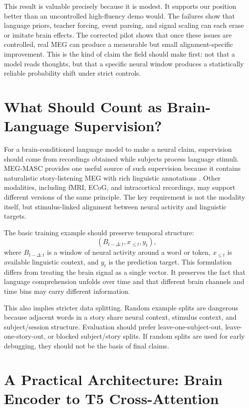\documentclass{article}
\begin{document}
This result is valuable precisely because it is modest.
It supports our position better than an uncontrolled high-fluency demo would.
The failures show that language priors, teacher forcing, event parsing, and signal scaling can each erase or imitate brain effects.
The corrected pilot shows that once these issues are controlled, real MEG can produce a measurable but small alignment-specific improvement.
This is the kind of claim the field should make first: not that a model reads thoughts, but that a specific neural window produces a statistically reliable probability shift under strict controls.

\section{What Should Count as Brain-Language Supervision?}

For a brain-conditioned language model to make a neural claim, supervision should come from recordings obtained while subjects process language stimuli.
MEG-MASC provides one useful source of such supervision because it contains naturalistic story-listening MEG with rich linguistic annotations \citep{gwilliams2023megmasc}.
Other modalities, including fMRI, ECoG, and intracortical recordings, may support different versions of the same principle.
The key requirement is not the modality itself, but stimulus-linked alignment between neural activity and linguistic targets.

The basic training example should preserve temporal structure:
\[
(B_{t-\Delta:t}, x_{\leq t}, y_t),
\]
where $B_{t-\Delta:t}$ is a window of neural activity around a word or token, $x_{\leq t}$ is available linguistic context, and $y_t$ is the prediction target.
This formulation differs from treating the brain signal as a single vector.
It preserves the fact that language comprehension unfolds over time and that different brain channels and time bins may carry different information.

This also implies stricter data splitting.
Random example splits are dangerous because adjacent words in a story share neural context, stimulus context, and subject/session structure.
Evaluation should prefer leave-one-subject-out, leave-one-story-out, or blocked subject/story splits.
If random splits are used for early debugging, they should not be the basis of final claims.

\section{A Practical Architecture: Brain Encoder to T5 Cross-Attention}
\end{document}

